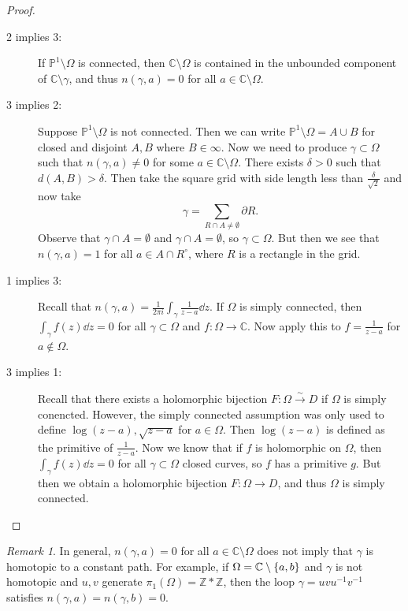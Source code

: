 \documentclass[leqno, openany]{memoir}
\theoremstyle{definition}
\theoremstyle{remark}
\newtheorem{rmk}[thm]{Remark}
\theoremstyle{plain}
\theoremstyle{definition}
\theoremstyle{remark}
\newcommand{\C}{\mathbb{C}}
\newcommand{\Z}{\mathbb{Z}}
\renewcommand{\P}{\mathbb{P}}
\begin{document}
\begin{proof}\leavevmode
    \begin{description}
        \item[2 implies 3:] If $\P^1 \setminus \Omega$ is connected, then $\C \setminus \Omega$ is contained in the unbounded component of $\C \setminus \gamma$, and thus $n(\gamma, a) = 0$ for all $a \in \C \setminus \Omega$.
        \item[3 implies 2:] Suppose $\P^1 \setminus \Omega$ is not connected. Then we can write $\P^1 \setminus \Omega = A \cup B$ for closed and disjoint $A, B$ where $B \in \infty$. Now we need to produce $\gamma \subset \Omega$ such that $n(\gamma, a) \neq 0$ for some $a \in \C \setminus \Omega$. There exists $\delta > 0$ such that $d(A,B) > \delta$. Then take the square grid with side length less than $\frac{\delta}{\sqrt{2}}$ and now take
            \[ \gamma = \sum_{R \cap A \neq \emptyset} \partial R. \]
            Observe that $\gamma \cap A = \emptyset$ and $\gamma \cap A = \emptyset$, so $\gamma \subset \Omega$. But then we see that $n(\gamma, a) = 1$ for all $a \in A \cap R^{\circ}$, where $R$ is a rectangle in the grid.
        \item[1 implies 3:] Recall that $n(\gamma, a) = \frac{1}{2 \pi i} \int_{\gamma} \frac{1}{z-a} \dd{z}$. If $\Omega$ is simply connected, then $\int_{\gamma} f(z) \dd{z} = 0$ for all $\gamma \subset \Omega$ and $f \colon \Omega \to \C$. Now apply this to $f = \frac{1}{z-a}$ for $a \notin \Omega$.
        \item[3 implies 1:] Recall that there exists a holomorphic bijection $F \colon \Omega \xrightarrow{\sim} D$ if $\Omega$ is simply conencted. However, the simply connected assumption was only used to define $\log(z-a), \sqrt{z-a}$ for $a \in \Omega$. Then $\log (z-a)$ is defined as the primitive of $\frac{1}{z-a}$. Now we know that if $f$ is holomorphic on $\Omega$, then $\int_{\gamma} f(z) \dd{z} = 0$ for all $\gamma \subset \Omega$ closed curves, so $f$ has a primitive $g$. But then we obtain a holomorphic bijection $F \colon \Omega \to D$, and thus $\Omega$ is simply connected. \qedhere
    \end{description}
\end{proof}

\begin{rmk}
    In general, $n(\gamma, a) = 0$ for all $a \in \C \setminus \Omega$ does not imply that $\gamma$ is homotopic to a constant path. For example, if $\Omega = \C \setminus \qty{a,b}$ and $\gamma$ is not homotopic and $u,v$ generate $\pi_1(\Omega) = \Z * \Z$, then the loop $\gamma = uvu^{-1}v^{-1}$ satisfies $n(\gamma, a) = n(\gamma, b) = 0$.
\end{rmk}
\end{document}
